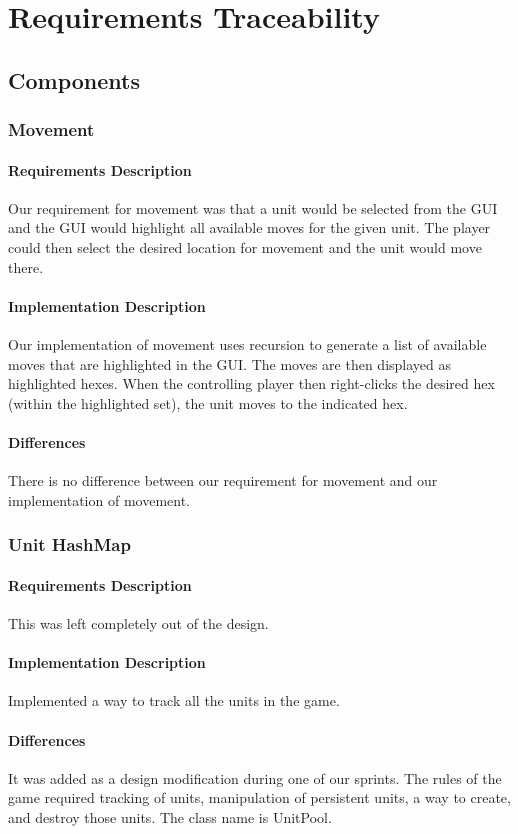 \documentclass[12pt,a4paper,titlepage]{article}
\begin{document}
\section{Requirements Traceability}
\subsection{Components}

\subsubsection{Movement}
\paragraph{Requirements Description} Our requirement for movement was that a unit would be selected from the GUI and the GUI would highlight all available moves for the given unit. The player could then select the desired location for movement and the unit would move there.
\paragraph{Implementation Description} Our implementation of movement uses recursion to generate a list of available moves that are highlighted in the GUI. The moves are then displayed as highlighted hexes. When the controlling player then right-clicks the desired hex (within the highlighted set), the unit moves to the indicated hex. 
\paragraph{Differences} There is no difference between our requirement for movement and our implementation of movement.

\subsubsection{Unit HashMap} 
\paragraph{Requirements Description} This was left completely out of the design. 
\paragraph{Implementation Description} Implemented a way to track all the units in the game.
\paragraph{Differences} It was added as a design modification during one of our sprints. The rules of the game required tracking of units, manipulation of persistent units, a way to create, and destroy those units. The class name is UnitPool.
\end{document}
